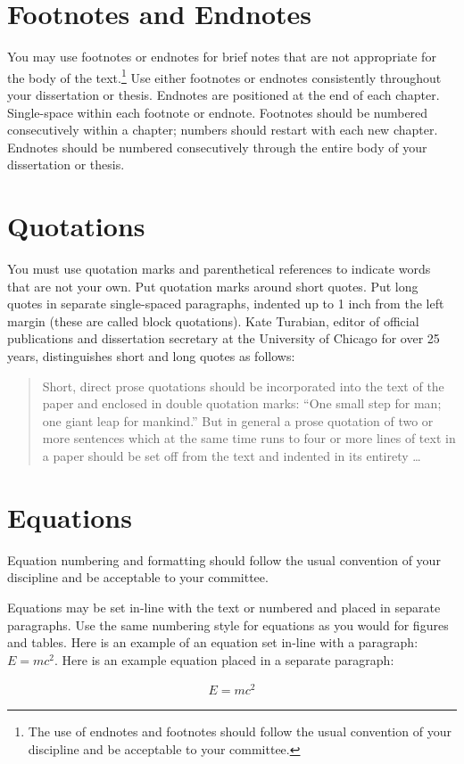 \section{Footnotes and Endnotes}

You may use footnotes or endnotes for brief notes that are not appropriate for the body of the text.\footnote{The use of endnotes and footnotes should follow the usual convention of your discipline and be acceptable to your committee.}
Use either footnotes or endnotes consistently throughout your dissertation or thesis.
Endnotes are positioned at the end of each chapter.
Single-space within each footnote or endnote.
Footnotes should be numbered consecutively within a chapter; numbers should restart with each new chapter.
Endnotes should be numbered consecutively through the entire body of your dissertation or thesis.

\section{Quotations}

You must use quotation marks and parenthetical references to indicate words that are not your own.
Put quotation marks around short quotes.
Put long quotes in separate single-spaced paragraphs, indented up to 1 inch from the left margin (these are called block quotations).
Kate Turabian, editor of official publications and dissertation secretary at the University of Chicago for over 25 years, distinguishes short and long quotes as follows:

\begin{quote}
    Short, direct prose quotations should be incorporated into the text of the paper and enclosed in
    double quotation marks: ``One small step for man; one giant leap for mankind.'' But in general a
    prose quotation of two or more sentences which at the same time runs to four or more lines of
    text in a paper should be set off from the text and indented in its
    entirety \ldots\ \cite{Turabian}
\end{quote}

\section{Equations}

Equation numbering and formatting should follow the usual convention of your discipline and be acceptable to your committee.

Equations may be set in-line with the text or numbered and placed in separate paragraphs.
Use the same numbering style for equations as you would for figures and tables.
Here is an example of an equation set in-line with a paragraph: $E = mc^{2}$.
Here is an example equation placed in a separate paragraph:

\begin{align}
	E = mc^{2}
\end{align}
